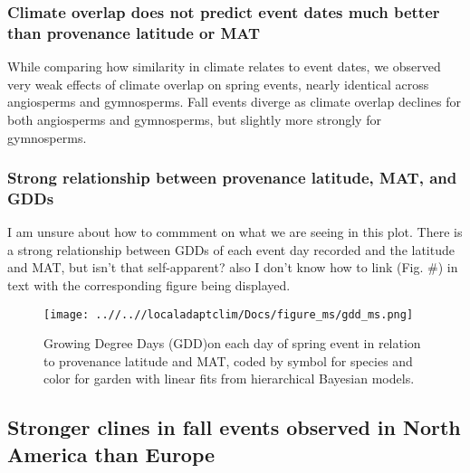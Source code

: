 \documentclass{article}
\begin{document}
\subsubsection {Climate overlap does not predict event dates much better than provenance latitude or MAT}

While comparing how similarity in climate relates to event dates, we observed very weak effects of climate overlap on spring events, nearly identical across angiosperms and gymnosperms. Fall events diverge as climate overlap declines for both angiosperms and gymnosperms, but slightly more strongly for gymnosperms.

\subsubsection {Strong relationship between provenance latitude, MAT, and GDDs}

I am unsure about how to commment on what we are seeing in this plot. There is a strong relationship between GDDs of each event day recorded and the latitude and MAT, but isn't that self-apparent? also I don't know how to link (Fig. \#) in text with the corresponding figure being displayed. 

\begin{figure}[!h] 
    \centering
 \texttt{[image: ..//..//localadaptclim/Docs/figure\_ms/gdd\_ms.png]}
    \caption{Growing Degree Days (GDD)on each day of spring event in relation to provenance latitude and MAT, coded by symbol for species and color for garden with linear fits from hierarchical Bayesian models.}
    \label{figure:gdd}
\end{figure}


\newpage


\subsection{Stronger clines in fall events observed in North America than Europe}




\end{document}
